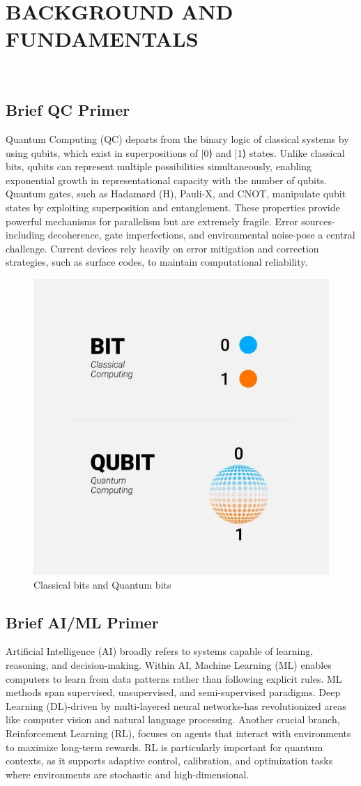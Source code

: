 \chapter{BACKGROUND AND FUNDAMENTALS}\
\section{Brief QC Primer}
\hspace*{0.3in}Quantum Computing (QC) departs from the binary logic of classical systems by using qubits, which exist in superpositions of |0⟩ and |1⟩ states. Unlike classical bits, qubits can represent multiple possibilities simultaneously, enabling exponential growth in representational capacity with the number of qubits. Quantum gates, such as Hadamard (H), Pauli-X, and CNOT, manipulate qubit states by exploiting superposition and entanglement. These properties provide powerful mechanisms for parallelism but are extremely fragile. Error sources-including decoherence, gate imperfections, and environmental noise-pose a central challenge. Current devices rely heavily on error mitigation and correction strategies, such as surface codes, to maintain computational reliability.\\
\begin{figure}[htbp]
	\centering
	\includegraphics[width=0.6\linewidth]{qubit.png}
	\caption{Classical bits and Quantum bits}
	\label{fig:enter-label}
\end{figure}
\section{Brief AI/ML Primer}
\hspace*{0.3in}Artificial Intelligence (AI) broadly refers to systems capable of learning, reasoning, and decision-making. Within AI, Machine Learning (ML) enables computers to learn from data patterns rather than following explicit rules. ML methods span supervised, unsupervised, and semi-supervised paradigms. Deep Learning (DL)-driven by multi-layered neural networks-has revolutionized areas like computer vision and natural language processing. Another crucial branch, Reinforcement Learning (RL), focuses on agents that interact with environments to maximize long-term rewards. RL is particularly important for quantum contexts, as it supports adaptive control, calibration, and optimization tasks where environments are stochastic and high-dimensional.\\
